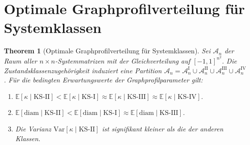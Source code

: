 ﻿\documentclass[12pt, a4paper, titlepage]{report}
\newtheorem{theorem}{Theorem}[section]
\theoremstyle{definition}
\theoremstyle{remark}
\newcommand{\KS}{\mathrm{KS}}
\begin{document}
\section{Optimale Graphprofilverteilung für Systemklassen}

\begin{theorem}[Optimale Graphprofilverteilung für Systemklassen]
\label{thm:opt_profil}
Sei $\mathcal{A}_n$ der Raum aller $n \times n$-Systemmatrizen mit der Gleichverteilung
auf $[-1,1]^{n^2}$. Die Zustandsklassenzugehörigkeit induziert eine Partition
$\mathcal{A}_n = \mathcal{A}_n^{\mathrm{I}} \cup \mathcal{A}_n^{\mathrm{II}} \cup
\mathcal{A}_n^{\mathrm{III}} \cup \mathcal{A}_n^{\mathrm{IV}}$.
Für die bedingten Erwartungswerte der Graphprofilparameter gilt:
\begin{enumerate}[label=(\roman*)]
  \item $\mathbb{E}[\kappa \mid \KS\text{-II}] < \mathbb{E}[\kappa \mid \KS\text{-I}]
    \approx \mathbb{E}[\kappa \mid \KS\text{-III}]
    \approx \mathbb{E}[\kappa \mid \KS\text{-IV}]$.
  \item $\mathbb{E}[\mathrm{diam} \mid \KS\text{-II}] <
    \mathbb{E}[\mathrm{diam} \mid \KS\text{-I}]
    \approx \mathbb{E}[\mathrm{diam} \mid \KS\text{-III}]$.
  \item Die Varianz $\mathrm{Var}[\kappa \mid \KS\text{-II}]$ ist signifikant
    kleiner als die der anderen Klassen.
\end{enumerate}
\end{theorem}
\end{document}

